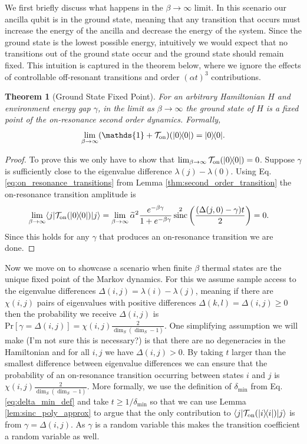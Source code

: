 \documentclass{article}
\newtheorem{theorem}{Theorem}
\newcommand{\on}{\rm on}
\newcommand{\ket}[1]{|#1\rangle}
\newcommand{\bra}[1]{\langle #1|}
\newcommand{\ketbra}[2]{| #1\rangle\! \langle #2|}
\newcommand{\prob}[1]{\text{Pr}\left[ #1 \right]}
\newcommand{\identity}{\mathds{1}}
\DeclareMathOperator{\sinc}{sinc}
\begin{document}
We first briefly discuss what happens in the $\beta \to \infty$ limit. In this scenario our ancilla qubit is in the ground state, meaning that any transition that occurs must increase the energy of the ancilla and decrease the energy of the system. Since the ground state is the lowest possible energy, intuitively we would expect that no transitions out of the ground state occur and the ground state should remain fixed. This intuition is captured in the theorem below, where we ignore the effects of controllable off-resonant transitions and order $(\alpha t)^3$ contributions.
\begin{theorem}[Ground State Fixed Point] \label{thm:ground_state_fixed}
    For an arbitrary Hamiltonian $H$ and environment energy gap $\gamma$, in the limit as $\beta \to \infty$ the ground state of $H$ is a fixed point of the on-resonance second order dynamics. Formally,
    \begin{equation}
        \lim_{\beta \to \infty} (\identity + \mathcal{T}_{\on})(\ketbra{0}{0}) = \ketbra{0}{0}.
    \end{equation}
\end{theorem}
\begin{proof}
    To prove this we only have to show that $\lim_{\beta \to \infty} \mathcal{T}_{\on}(\ketbra{0}{0}) = 0$. Suppose $\gamma$ is sufficiently close to the eigenvalue difference $\lambda(j) - \lambda(0)$. Using Eq. \eqref{eq:on_resonance_transitions} from Lemma \ref{thm:second_order_transition} the on-resonance transition amplitude is
    \begin{align}
        \lim_{\beta \to \infty} \bra{j} \mathcal{T}_{\on}(\ketbra{0}{0}) \ket{j} &= \lim_{\beta \to \infty} \widetilde{\alpha}^2 \frac{e^{-\beta \gamma}}{1 + e^{-\beta \gamma}} \sinc^2 \left( \frac{(\Delta(j,0) - \gamma)t}{2} \right) = 0.
    \end{align}
    Since this holds for any $\gamma$ that produces an on-resonance transition we are done.
\end{proof}

Now we move on to showcase a scenario when finite $\beta$ thermal states are the unique fixed point of the Markov dynamics. For this we assume sample access to the eigenvalue differences $\Delta(i,j) = \lambda(i) - \lambda(j)$, meaning if there are $\chi(i,j)$ pairs of eigenvalues with positive differences $\Delta(k,l) = \Delta(i,j) \ge 0$ then the probability we receive $\Delta(i,j)$ is $\prob{\gamma = \Delta(i,j)} = \chi(i,j) \frac{2}{\dim_S(\dim_S - 1)}$. One simplifying assumption we will make (I'm not sure this is necessary?) is that there are no degeneracies in the Hamiltonian and for all $i,j$ we have $\Delta(i,j) > 0$. By taking $t$ larger than the smallest difference between eigenvalue differences we can ensure that the probability of an on-resonance transition occurring between states $i$ and $j$ is $\chi(i,j) \frac{2}{\dim_S(\dim_S - 1)}$. More formally, we use the definition of $\delta_{\min}$ from Eq. \eqref{eq:delta_min_def} and take $t \ge 1/ \delta_{\min}$ so that we can use Lemma \ref{lem:sinc_poly_approx} to argue that the only contribution to $\bra{j} \mathcal{T}_{\on}(\ketbra{i}{i}) \ket{j}$ is from $\gamma = \Delta(i,j)$. As $\gamma$ is a random variable this makes the transition coefficient a random variable as well. 
\end{document}
